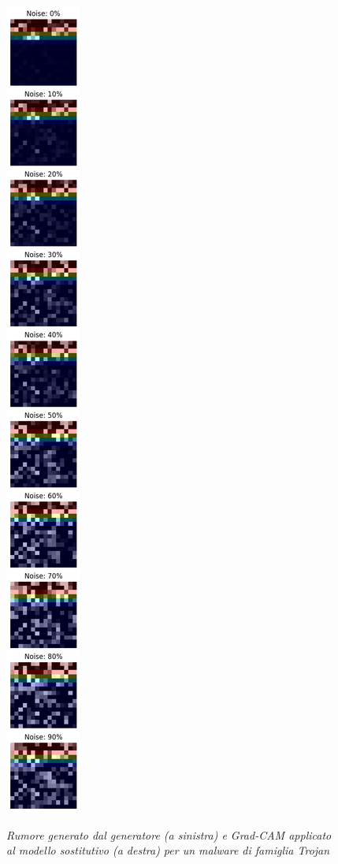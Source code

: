 \begin{figure}[ht]
\begin{minipage}{0.45\textwidth}
        \label{fig:rumore_scala_grigi}
    \end{minipage}\hfill
    \begin{minipage}{0.45\textwidth}
        \centering
        \includegraphics[width=0.3\linewidth]{images/vertical_gradcam_noise_grid_100.png}
        \label{fig:grad_cam}
    \end{minipage}
    \caption{\emph{Rumore generato dal generatore (a sinistra) e Grad-CAM applicato al modello sostitutivo (a destra) per un malware di famiglia Trojan}}
\end{figure}
~\\
